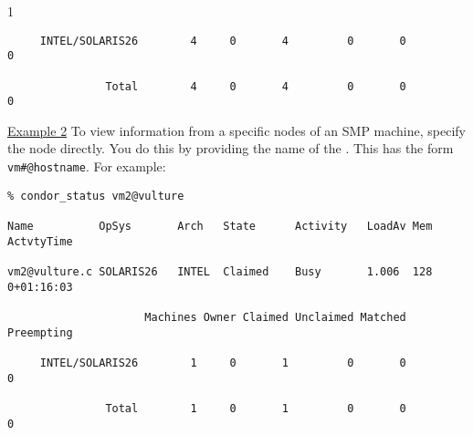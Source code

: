 \begin{ManPage}{\label{man-condor-status}}{1}
\begin{verbatim}
     INTEL/SOLARIS26        4     0       4         0       0          0

               Total        4     0       4         0       0          0
\end{verbatim}

\underline{Example 2} To view information from a specific nodes of an
SMP machine, specify the node directly.
You do this by providing the name of the .
This has the form \texttt{vm\#@hostname}.
For example:
\begin{verbatim}
% condor_status vm2@vulture

Name          OpSys       Arch   State      Activity   LoadAv Mem   ActvtyTime

vm2@vulture.c SOLARIS26   INTEL  Claimed    Busy       1.006  128   0+01:16:03

                     Machines Owner Claimed Unclaimed Matched Preempting

     INTEL/SOLARIS26        1     0       1         0       0          0

               Total        1     0       1         0       0          0
\end{verbatim}

\end{ManPage}

